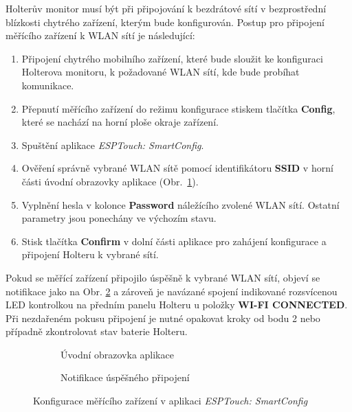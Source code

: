 Holterův monitor musí být při připojování k bezdrátové sítí v bezprostřední
blízkosti chytrého zařízení, kterým bude konfigurován. Postup pro připojení
měřícího zařízení k WLAN sítí je následující:
\begin{enumerate}
    \item Připojení chytrého mobilního zařízení, které bude sloužit ke
          konfiguraci Holterova monitoru, k požadované WLAN sítí, kde bude
          probíhat komunikace.
    \item Přepnutí měřícího zařízení do režimu konfigurace stiskem tlačítka
          \textbf{Config}, které se nachází na horní ploše okraje zařízení.
    \item Spuštění aplikace \textit{ESPTouch: SmartConfig}.
    \item Ověření správně vybrané WLAN sítě pomocí identifikátoru \textbf{SSID}
          v horní části úvodní obrazovky aplikace (Obr.~\ref{fig:app_screen1}).
    \item Vyplnění hesla v kolonce \textbf{Password} náležícího zvolené WLAN
          sítí. Ostatní parametry jsou ponechány ve výchozím stavu.
    \item Stisk tlačítka \textbf{Confirm} v dolní části aplikace pro zahájení
          konfigurace a připojení Holteru k vybrané sítí.
\end{enumerate}

Pokud se měřící zařízení připojilo úspěšně k vybrané WLAN sítí, objeví se
notifikace jako na Obr. \ref{fig:app_screen2} a zároveň je navázané spojení
indikované rozsvícenou LED kontrolkou na předním panelu Holteru u položky
\textbf{WI-FI CONNECTED}. Při nezdařeném pokusu připojení je nutné opakovat
kroky od bodu 2 nebo případně zkontrolovat stav baterie Holteru.

\begin{figure}[h]
    \centering
    \begin{subfigure}[b]{0.45\textwidth}
        \centering
        \textcolor{cyan}{\fboxrule=2pt\fboxsep=0pt}
        \caption{Úvodní obrazovka aplikace}
        \label{fig:app_screen1}
    \end{subfigure}
    \hfill
    \begin{subfigure}[b]{0.45\textwidth}
        \centering
        \textcolor{cyan}{\fboxrule=2pt\fboxsep=0pt}
        \caption{Notifikace úspěšného připojení}
        \label{fig:app_screen2}
    \end{subfigure}
    \caption{Konfigurace měřícího zařízení v aplikaci \textit{ESPTouch:
            SmartConfig}}
    \label{fig:esptouch_app}
\end{figure}

